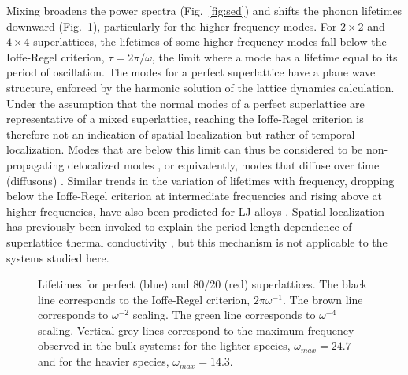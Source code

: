 Mixing broadens the power spectra (Fig.~\ref{fig:sed}) and shifts the phonon lifetimes downward (Fig.~\ref{FIG:lifetime}), particularly for the higher frequency modes. For $2 \times 2$ and $ 4 \times 4$ superlattices,  the lifetimes of some higher frequency modes fall below the Ioffe-Regel criterion, $\tau =2\pi/\omega$, the limit where a mode has a lifetime equal to its period of oscillation. The modes for a perfect superlattice have a plane wave structure, enforced by the harmonic solution of the lattice dynamics calculation. Under the assumption that the normal modes of a perfect superlattice are representative of a mixed superlattice, reaching the Ioffe-Regel criterion is therefore not an indication of spatial localization but rather of temporal localization. Modes that are below this limit can thus be considered to be non-propagating delocalized modes \cite{allen_thermal_1993}, or equivalently, modes that diffuse over time (diffusons) \cite{allen1999diffusons}. Similar trends in the variation of lifetimes with frequency, dropping below the Ioffe-Regel criterion at intermediate frequencies and rising above at higher frequencies, have also been predicted for LJ alloys \cite{jason2013vc}. Spatial localization has previously been invoked to explain the period-length dependence of superlattice thermal conductivity \cite{PhysRevB.61.3091}, but this mechanism is not applicable to the systems studied here.
\renewcommand{\textfraction}{0.0}
\begin{figure}%
\begin{center}
\renewcommand{\figure}{Fig.}
\caption{Lifetimes for perfect (blue) and 80/20 (red) superlattices. The black line corresponds to the Ioffe-Regel criterion, $2\pi\omega^{-1}$. The brown line corresponds to $\omega^{-2}$ scaling. The green line corresponds to $\omega^{-4}$ scaling. Vertical grey lines correspond to the maximum frequency observed in the bulk systems: for the lighter species, $\omega_{max}=24.7$ and for the heavier species, $\omega_{max}=14.3$. } 
\label{FIG:lifetime}
\end{center}
\end{figure}

